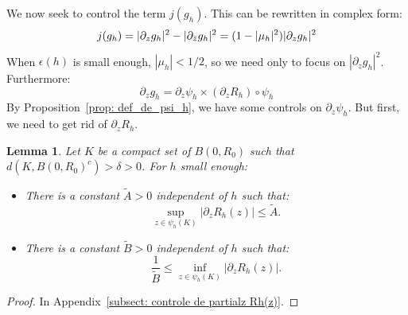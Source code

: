 \documentclass[leqno,11pt,letterpaper, english]{amsart}
\theoremstyle{plain}
\newtheorem{lem}[prop]{Lemma}
\theoremstyle{definition}
\numberwithin{equation}{section}
\begin{document}
We now seek to control the term $j(g_h)$. This can be rewritten in complex form:
\begin{equation}
		\label{eq: jacobienComlexe}
		j(g_h)=|\partial_z g_h|^2-|\partial_{\Bar{z}}g_h|^2=(1-|\mu_h|^2)|\partial_z g_h|^2
\end{equation}
When $\epsilon(h)$ is small enough, $|\mu_h| < 1/2$, so we need only to focus on $|\partial_z g_h|^2$. Furthermore:
\begin{equation}
		\label{eq: derivee_de_gh}
		\partial_z g_h = \partial_z \psi_h \times (\partial_z R_h) \circ \psi_h
\end{equation}
By Proposition~\ref{prop: def_de_psi_h}, we have some controls on $\partial_z \psi_h$. But first, we need to get rid of $\partial_z R_h$.
\begin{lem}
Let $K$ be a compact set of $B(0, R_0)$ such that $d(K, B(0, R_0)^c) > \delta > 0$. For $h$ small enough:
\begin{itemize}
    \item There is a constant $\tilde{A} > 0$ independent of $h$ such that:
    \begin{equation}
    \sup_{z \in \psi_h(K)} |\partial_z R_h(z)| \leq \tilde{A}.
   \end{equation}

    \item There is a constant $\tilde{B} > 0$ independent of $h$ such that:
    \begin{equation}
    \frac{1}{\tilde{B}} \leq \inf_{z \in \psi_h(K)} |\partial_z R_h(z)|.
    \end{equation}
\end{itemize}
\end{lem}
\begin{proof}
In Appendix~\ref{subsect: controle de partialz Rh(z)}.
\end{proof}
\end{document}
